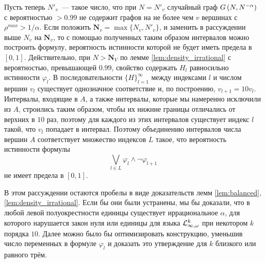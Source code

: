 Пусть теперь $N'_v$~--- такое число, что при $N = N'_v$ случайный граф $G\left(N,N^{-\alpha}\right)$ с вероятностью $>0.99$ не содержит графов на не более чем $v$ вершинах с $\rho^{max} > 1/\alpha$.
Если положить $\mathbf{N}_v = \max\{N_v, N'_v\}$, и заменить в рассуждении выше $N_v$ на $\mathbf{N}_v$, то с помощью полученных таким образом интервалов можно построить формулу, вероятность истинности которой не будет иметь предела в $[0,1]$.
Действительно, при $N > \mathbf{N}_V$ по лемме \ref{lem:density_irrational} с вероятностью, превышающей $0.99$, свойство содержать $H_l$ равносильно истинности $\varphi_l$.
В последовательности $\{H\}_{l=1}^\infty$ между индексами $l$ и числом вершин $v_l$ существует однозначное соответствие и, по построению, $v_{l+1} = 10 v_l$.
Интервалы, входящие в $A$, а также интервалы, которые мы намеренно исключили из $A$, строились таким образом, чтобы их нижние границы отличались от верхних в $10$ раз, поэтому для каждого из этих интервалов существует индекс $l$ такой, что $v_l$ попадает в интервал.
Поэтому объединению интервалов числа вершин $A$ соответствует множество индексов $L$ такое, что вероятность истинности формулы \[
\bigvee_{l \in L} \varphi_l \wedge \neg \varphi_{l+1} 
\]
не имеет предела в $[0,1]$.

В этом рассуждении остаются пробелы в виде доказательств лемм \ref{lem:balanced}, \ref{lem:density_irrational}.
Если бы они были устранены, мы бы доказали, что в любой левой полуокрестности единицы существует иррациональное $\alpha$, для которого нарушается закон нуля или единицы для языка $\mathcal{L}^k_{\infty, \omega}$ при некотором $k$ порядка $10$.
Далее можно было бы оптимизировать конструкцию, уменьшив число переменных в формуле $\varphi_l$ и доказать это утверждение для $k$ близкого или равного трём.